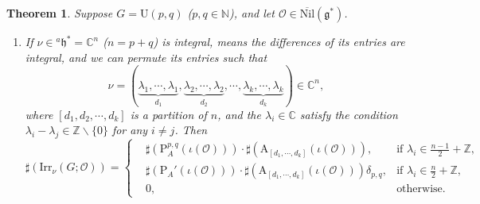 \documentclass[12pt, a4paper]{amsart}
\numberwithin{equation}{section}
\newtheorem{thm}{Theorem}[section]
\newcommand{\BC}{{\mathbb {C}}}
\newcommand{\BN}{{\mathbb {N}}}
\newcommand{\BZ}{{\mathbb {Z}}}
\newcommand{\CO}{{\mathcal {O}}}
\newcommand{\fg}{\mathfrak{g}}
\newcommand{\fh}{\mathfrak{h}}
\newcommand{\U}{{\mathrm{U}}}
\newcommand{\Irr}{{\mathrm{Irr}}}
\newcommand{\Nil}{{\mathrm{Nil}}}
\renewcommand{\bar}{\overline}
\begin{document}
\begin{thm}\label{U}
    Suppose $G = \U(p,q)$ ($p, q \in \BN$), and let $\CO \in \bar{\Nil}(\fg^*)$.
    \begin{enumerate}
        \item If $\nu \in {^a\fh^*} = \BC^n$ ($n = p+q$) is integral, means the differences of its entries are integral, and we can permute its entries such that 
        \[ 
        \nu =  (\underbrace{\lambda_1, \cdots, \lambda_1}_{d_1}, \underbrace{\lambda_2, \cdots, \lambda_2}_{d_2}, \cdots, \underbrace{\lambda_k, \cdots, \lambda_k}_{d_k} ) \in \BC^n, 
        \]
        where $[d_1, d_2, \cdots, d_k]$ is a partition of $n$, and the $\lambda_i \in \BC$ satisfy the condition $\lambda_i - \lambda_j \in \BZ \backslash \{0\}$ for any $i \neq j$. Then
        \begin{equation}
            \sharp(\Irr_{\nu}(G;\CO)) = \left\{
            \begin{aligned}
                &\sharp(\mathrm{P}_{A}^{p,q}(\iota(\CO))) \cdot \sharp(\mathrm{A}_{[d_1,\cdots,d_{k}]}(\iota(\CO))), & \textrm{if $\lambda_i \in \frac{n-1}{2} + \BZ$}, \\ 
                &\sharp(\mathrm{P}_{A}'(\iota(\CO)))\cdot\sharp(\mathrm{A}_{[d_1,\cdots,d_k]}(\iota(\CO)))\delta_{p,q}, & \textrm{if $\lambda_i \in \frac{n}{2} + \BZ$},\\
                &0, & \textrm{otherwise}.
            \end{aligned}
            \right.
        \end{equation}


\end{enumerate}
\end{thm}
\end{document}
